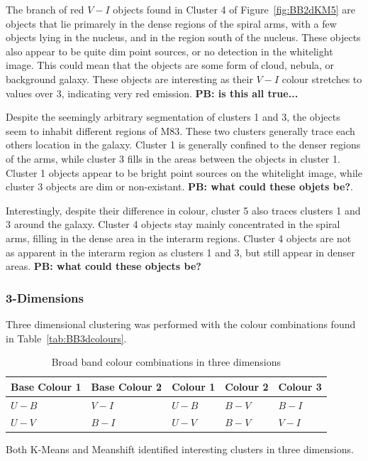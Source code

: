 The branch of red $V - I$ objects found in Cluster 4 of Figure~\ref{fig:BB2dKM5} are objects that lie primarely in the dense regions of the spiral arms, with a few objects lying in the nucleus, and in the region south of the nucleus.
These objects also appear to be quite dim point sources, or no detection in the whitelight image.
This could mean that the objects are some form of cloud, nebula, or background galaxy. 
These objects are interesting as their $V - I$ colour stretches to values over 3, indicating very red emission. \textbf{PB: is this all true...}

Despite the seemingly arbitrary segmentation of clusters 1 and 3, the objects seem to inhabit different regions of M83.
These two clusters generally trace each others location in the galaxy. 
Cluster 1 is generally confined to the denser regions of the arms, while cluster 3 fills in the areas between the objects in cluster 1.
Cluster 1 objects appear to be bright point sources on the whitelight image, while cluster 3 objects are dim or non-existant.
\textbf{PB: what could these objets be?}.

Interestingly, despite their difference in colour, cluster 5 also traces clusters 1 and 3 around the galaxy.
Cluster 4 objects stay mainly concentrated in the spiral arms, filling in the dense area in the interarm regions.
Cluster 4 objects are not as apparent in the interarm region as clusters 1 and 3, but still appear in denser areas. \textbf{PB: what could these objects be?}

\subsubsection{3-Dimensions}
Three dimensional clustering was performed with the colour combinations found in Table~\ref{tab:BB3dcolours}.

\begin{table}
\centering
\caption{Broad band colour combinations in three dimensions}
\label{tab:BBcolours}
\begin{tabular}{lllll}
\hline\hline
Base Colour 1 & Base Colour 2 & Colour 1 & Colour 2 & Colour 3 \\
\hline
$U - B$ & $V - I$ & $U - B$ & $B - V$ & $B - I$ \\
$U - V$ & $B - I$ & $U - V$ & $B - V$ & $V - I$ \\
\hline
\end{tabular}
\end{table}

Both K-Means and Meanshift identified interesting clusters in three dimensions.

